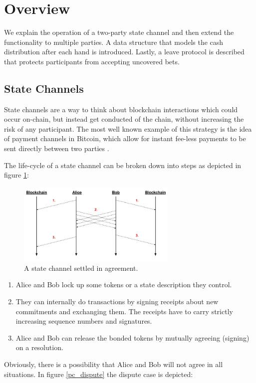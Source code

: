 \section{Overview}
We explain the operation of a two-party state channel and then extend the functionality to multiple parties. A data structure that models the cash distribution after each hand is introduced. Lastly, a leave protocol is described that protects participants from accepting uncovered bets. 


\subsection{State Channels}
State channels are a way to think about blockchain interactions which could occur on-chain, but instead get conducted of the chain, without  increasing the risk of any participant. The most well known example of this strategy is the idea of payment channels in Bitcoin, which allow for instant fee-less payments to be sent directly between two parties \cite{coleman15}. 

The life-cycle of a state channel can be broken down into steps as depicted in figure \ref{pc_settle}:

\begin{figure}[!ht]
\centering
\includegraphics[width=3.0in]{images/settle.png}
\caption{A state channel settled in agreement.}
\label{pc_settle}
\end{figure}

\begin{enumerate}
\item Alice and Bob lock up some tokens or a state description they control.
\item They can internally do transactions by signing receipts about new commitments and exchanging them. The receipts have to carry strictly increasing sequence numbers and signatures.
\item Alice and Bob can release the bonded tokens by mutually agreeing (signing) on a resolution.
\end{enumerate}

Obviously, there is a possibility that Alice and Bob will not agree in all situations. In figure \ref{pc_dispute} the dispute case is depicted:

